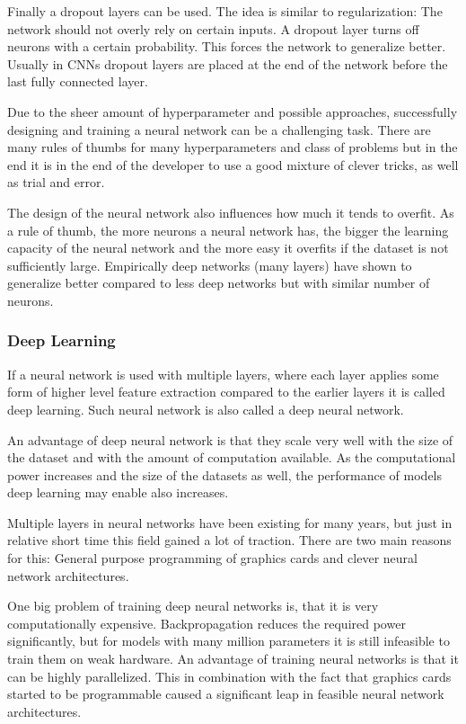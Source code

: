 \documentclass[draft,final,oneside]{vutinfth} %
\begin{document}
Finally a dropout layers can be used. The idea is similar to regularization: The network should not overly rely on certain inputs. A dropout layer turns off neurons with a certain probability. This forces the network to generalize better. Usually in CNNs dropout layers are placed at the end of the network before the last fully connected layer.


Due to the sheer amount of hyperparameter and possible approaches, successfully designing and training a neural network can be a challenging task. There are many rules of thumbs for many hyperparameters and class of problems but in the end it is in the end of the developer to use a good mixture of clever tricks, as well as trial and error.

The design of the neural network also influences how much it tends to overfit. As a rule of thumb, the more neurons a neural network has, the bigger the learning capacity of the neural network and the more easy it overfits if the dataset is not sufficiently large. Empirically deep networks (many layers) have shown to generalize better compared to less deep networks but with similar number of neurons.

\subsubsection{Deep Learning}

If a neural network is used with multiple layers, where each layer applies some form of higher level feature extraction compared to the earlier layers it is called deep learning. Such neural network is also called a deep neural network.

An advantage of deep neural network is that they scale very well with the size of the dataset and with the amount of computation available. As the computational power increases and the size of the datasets as well, the performance of models deep learning may enable also increases.

Multiple layers in neural networks have been existing for many years, but just in relative short time this field gained a lot of traction. There are two main reasons for this: General purpose programming of graphics cards and clever neural network architectures.

One big problem of training deep neural networks is, that it is very computationally expensive. Backpropagation reduces the required power significantly, but for models with many million parameters it is still infeasible to train them on weak hardware. An advantage of training neural networks is that it can be highly parallelized. This in combination with the fact that graphics cards started to be programmable caused a significant leap in feasible neural network architectures.
\end{document}
